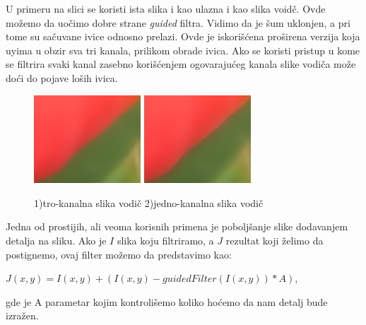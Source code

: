 \documentclass[a4paper,12pt,titlepage]{article}
\begin{document}
U primeru na slici se koristi ista slika i kao ulazna i kao slika voidč. Ovde možemo da uočimo dobre strane \emph{guided} filtra. Vidimo da je šum uklonjen, a pri tome su sačuvane ivice odnosno prelazi. Ovde je iskorišćena proširena verzija koja uyima u obzir sva tri kanala, prilikom obrade ivica. Ako se koristi pristup u kome se filtrira svaki kanal zasebno korišćenjem ogovarajućeg kanala slike vodiča može doći do pojave loših ivica. 

\begin{figure}[ht!]
\centering
\includegraphics[width=40mm]{img/zoom1.png}
\includegraphics[width=40mm]{img/zoom2.png}
\caption{1)tro-kanalna slika vodič 2)jedno-kanalna slika vodič }
\label{overflow}
\end{figure}

Jedna od prostijih, ali veoma korisnih primena je poboljšanje slike dodavanjem detalja na sliku. Ako je $I$ slika koju filtriramo, a $J$ rezultat koji želimo da postignemo, ovaj filter možemo da predstavimo kao:

\begin{center}
$J(x, y) = I(x, y) + (I(x, y) - guidedFilter(I(x, y)) * A)$,
\end{center}

gde je A parametar kojim kontrolišemo koliko hoćemo da nam detalj bude izražen.
\end{document}
